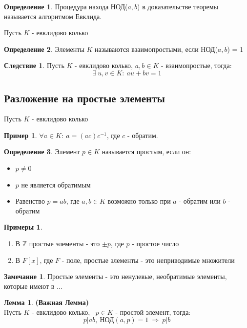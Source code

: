 \documentclass[a4paper, 12pt]{article}
\newcommand{\Z}{\mathbb Z}
\newcommand\tab[1][.5cm]{\hspace*{#1}}
\newcounter{lemcount}
\newcounter{lemcount2}
\theoremstyle{definition}
\newtheorem*{definition}{Определение}
\newtheorem*{consequense}{Следствие}
\newtheorem*{remark}{Замечание}
\newtheorem*{example}{Примеры}
\newtheorem*{example1}{Пример}
\newtheorem{lemmanum}[lemcount]{Лемма}
\begin{document}
  \begin{definition}
    Процедура находа НОД($a,b$) в доказательстве теоремы называется алгоритмом Евклида.
  \end{definition}
  Пусть $K$ - евклидово колько
  \begin{definition}
    Элементы $K$ называются взаимопростыми, если НОД($a,b$) = 1  
  \end{definition}
  \begin{consequense}
    Пусть $K$ - евклидово колько, $a, b \in K$ - взаимопростые, тогда:
    $$\exists \ u, v \in K: \ au+bv=1$$  
  \end{consequense}
  \subsection{Разложение на простые элементы}
  Пусть $K$ - евклидово колько
  \begin{example1}
    $\forall a \in K: \ a = (ac)c^{-1}$, где $c$ - обратим.  
  \end{example1}
  \begin{definition}
    Элемент $p \in K$ называется простым, если он:
    \begin{itemize}
      \item[1)] $p\neq 0$
      \item[2)] $p$ не является обратимым
      \item[3)] Равенство $p = ab$, где $a, b \in K$ возможно только при $a$ - обратим или $b$ - обратим    
    \end{itemize}
  \end{definition}
  \begin{example}\tab
    \begin{enumerate}
      \item В $\Z$ простые элементы - это $\pm p$, где $p$ - простое число
      \item В $F[x]$, где $F$ - поле, простые элементы  - это неприводимые множители  
    \end{enumerate}
  \end{example}
  \begin{remark}
  Простые элементы - это ненулевые, необратимые элементы, которые имеют в ...
  \end{remark}
  \setcounter{lemcount}{0}
  \begin{lemmanum} \textbf{(Важная Лемма)}\\
    Пусть $K$ - евклидово колько, \ $p \in K$ - простой элемент, тогда:
    $$p|ab, \ \text{НОД}(a,p) = 1 \ \Longrightarrow \ p|b$$ 
  \end{lemmanum}
\end{document}
